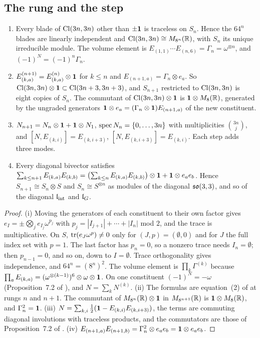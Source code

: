 \subsection{The rung and the step}
\label{e3:sec:rung}

\begin{proposition}
\label{e3:prop:rung}
\begin{enumerate}[label=(\roman*),leftmargin=2.2em]
\item Every blade of $\mathrm{Cl}(3n,3n)$ other than $\pm\mathbf 1$ is traceless on $S_n$. Hence the $64^n$ blades are linearly independent and
$\mathrm{Cl}(3n,3n)\cong M_{8^n}(\mathbb{R})$, with $S_n$ its unique irreducible module. The volume element is $E_{(1,1)}\cdots E_{(n,6)}=\Gamma_n=\omega^{\otimes n}$, and
$(-1)^N=(-1)^n\Gamma_n$.
\item $E^{(n+1)}_{(k,a)}=E^{(n)}_{(k,a)}\otimes\mathbf 1$ for $k\le n$ and $E_{(n+1,a)}=\Gamma_n\otimes e_a$. So $\mathrm{Cl}(3n,3n)\otimes\mathbf 1\subset\mathrm{Cl}(3n+3,3n+3)$, and
$S_{n+1}$ restricted to $\mathrm{Cl}(3n,3n)$ is eight copies of $S_n$. The commutant of $\mathrm{Cl}(3n,3n)\otimes\mathbf 1$ is $\mathbf 1\otimes M_8(\mathbb{R})$, generated by the
ungraded generators $\mathbf 1\otimes e_a=(\Gamma_n\otimes\mathbf 1)E_{(n+1,a)}$ of the new constituent.
\item $N_{n+1}=N_n\otimes\mathbf 1+\mathbf 1\otimes N_1$, $\operatorname{spec} N_n=\{0,\dots,3n\}$ with multiplicities $\binom{3n}j$, and $[N,E_{(k,i)}]=E_{(k,i+3)}$,
$[N,E_{(k,i+3)}]=E_{(k,i)}$. Each step adds three modes.
\item Every diagonal bivector satisfies $\sum_{k\le n+1}E_{(k,a)}E_{(k,b)}=\bigl(\sum_{k\le n}E_{(k,a)}E_{(k,b)}\bigr)\otimes\mathbf 1+\mathbf 1\otimes e_ae_b$. Hence
$S_{n+1}\cong S_n\otimes S$ and $S_n\cong S^{\otimes n}$ as modules of the diagonal $\mathfrak{so}(3,3)$, and so of the diagonal $\mathfrak l_{\rm int}$ and $\mathfrak l_G$.
\end{enumerate}
\end{proposition}

\begin{proof}
(i) Moving the generators of each constituent to their own factor gives $e_I=\pm\bigotimes_je_{I_j}\omega^{p_j}$ with $p_j=|I_{j+1}|+\cdots+|I_n|$ mod $2$, and
the trace is multiplicative. On $S$, $\operatorname{tr}(e_J\omega^p)\ne0$ only for $(J,p)=(\emptyset,0)$ and for $J$ the full index set with $p=1$. The last
factor has $p_n=0$, so a nonzero trace needs $I_n=\emptyset$; then $p_{n-1}=0$, and so on, down to $I=\emptyset$. Trace orthogonality gives
independence, and $64^n=(8^n)^2$. The volume element is $\prod_k\Gamma^{(k)}$ because $\prod_aE_{(k,a)}=(\omega^{\otimes(k-1)})^6\otimes\omega\otimes\mathbf 1$. On one
constituent $(-1)^N=-\omega$ (Proposition~7.2 of \cite{RE}), and $N=\sum_kN^{(k)}$. (ii) The formulas are equation~(2) of \cite{ES17} at rungs $n$
and $n+1$. The commutant of $M_{8^n}(\mathbb{R})\otimes\mathbf 1$ in $M_{8^{n+1}}(\mathbb{R})$ is $\mathbf 1\otimes M_8(\mathbb{R})$, and $\Gamma_n^2=\mathbf 1$. (iii) $N=\sum_{k,i}\tfrac12(\mathbf 1-E_{(k,i)}E_{(k,i+3)})$,
the terms are commuting diagonal involutions with traceless products, and the commutators are those of Proposition~7.2 of \cite{RE}. (iv)
$E_{(n+1,a)}E_{(n+1,b)}=\Gamma_n^2\otimes e_ae_b=\mathbf 1\otimes e_ae_b$.
\end{proof}

